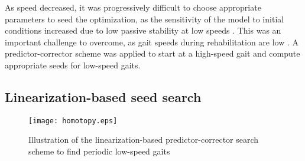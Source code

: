 As speed decreased, it was progressively difficult to choose appropriate parameters to seed the optimization, as the sensitivity of the model to initial conditions increased due to low passive stability at low speeds \cite{kuo2001simple}. This was an important challenge to overcome, as gait speeds during rehabilitation are low \cite{seethapathi2015metabolic}. A predictor-corrector scheme was applied to start at a high-speed gait and compute appropriate seeds for low-speed gaits. 

\subsection{Linearization-based seed search}\label{sec:gait_lib}

\begin{figure}
	\centering
	\texttt{[image: homotopy.eps]}
	\caption{Illustration of the linearization-based predictor-corrector search scheme to find periodic low-speed gaits}\label{fig:homotopy}
\end{figure}

